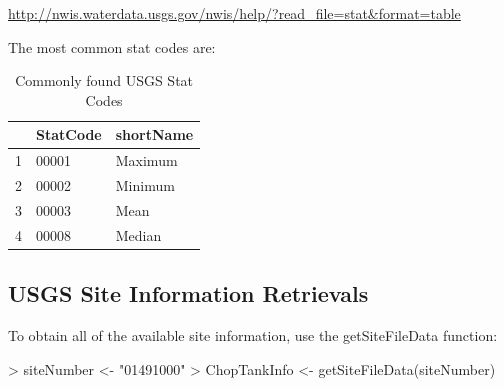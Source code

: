 \documentclass[a4paper,11pt]{article}
\begin{document}
\url{http://nwis.waterdata.usgs.gov/nwis/help/?read_file=stat&format=table}

The most common stat codes are:
\begin{table}[ht]
\begin{center}
\caption{Commonly found USGS Stat Codes}
\begin{tabular}{rll}
  \hline
 & StatCode & shortName \\ 
  \hline
1 & 00001 & Maximum \\ 
  2 & 00002 & Minimum \\ 
  3 & 00003 & Mean \\ 
  4 & 00008 & Median \\ 
   \hline
\end{tabular}
\end{center}
\end{table}

\subsection{USGS Site Information Retrievals}
To obtain all of the available site information, use the getSiteFileData function:
\begin{Schunk}
\begin{Sinput}
> siteNumber <- "01491000"
> ChopTankInfo <- getSiteFileData(siteNumber)
\end{Sinput}
\end{Schunk}
\end{document}
